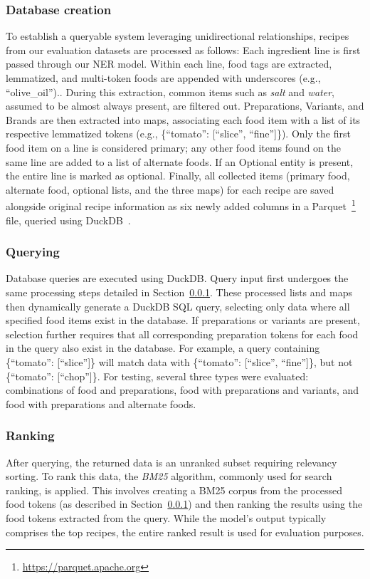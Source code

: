 \documentclass[11pt]{article}
\begin{document}
\subsubsection{Database creation}\label{sec:dbStructure}
To establish a queryable system leveraging unidirectional relationships, recipes
from our evaluation datasets are processed as follows: Each ingredient line is
first passed through our NER model.
Within each line, food tags are extracted, lemmatized, and multi-token foods are
appended with underscores (e.g., ``olive\_oil'')..
During this extraction, common items such as \emph{salt} and \emph{water},
assumed to be almost always present, are filtered out.
Preparations, Variants, and Brands are then extracted into maps, associating
each food item with a list of its respective lemmatized tokens (e.g.,
\{``tomato'': [``slice'', ``fine'']\}).
Only the first food item on a line is considered primary; any other food items
found on the same line are added to a list of alternate foods.
If an Optional entity is present, the entire line is marked as optional.
Finally, all collected items (primary food, alternate food, optional lists, and
the three maps) for each recipe are saved alongside original recipe information
as six newly added columns in a
Parquet~\footnote{\url{https://parquet.apache.org}} file, queried using
DuckDB~\cite{duckdb}.

\subsubsection{Querying}
Database queries are executed using DuckDB\@.
Query input first undergoes the same processing steps detailed in
Section~\ref{sec:dbStructure}.
These processed lists and maps then dynamically generate a DuckDB SQL query,
selecting only data where all specified food items exist in the database.
If preparations or variants are present, selection further requires that all
corresponding preparation tokens for each food in the query also exist in the
database.
For example, a query containing \{``tomato'': [``slice'']\} will match data with
\{``tomato'': [``slice'', ``fine'']\}, but not \{``tomato'': [``chop'']\}.
For testing, several three types were evaluated: combinations of food and
preparations, food with preparations and variants, and food with preparations
and alternate foods.

\subsubsection{Ranking}
After querying, the returned data is an unranked subset requiring relevancy
sorting.
To rank this data, the \emph{BM25} algorithm, commonly used for search ranking,
is applied.
This involves creating a BM25 corpus from the processed food tokens (as
described in Section~\ref{sec:dbStructure}) and then ranking the results using
the food tokens extracted from the query.
While the model's output typically comprises the top recipes, the entire ranked
result is used for evaluation purposes.
\end{document}
